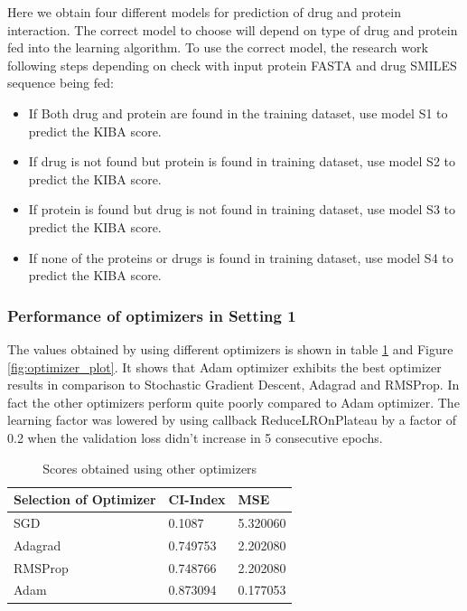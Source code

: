 Here we obtain four different models for prediction of drug and protein interaction. The correct model to choose will depend on type of drug and protein fed into the learning algorithm. To use the correct model, the research work following steps depending on check with input protein FASTA and drug SMILES sequence being fed:
\begin{itemize}
    \item If Both drug and protein are found in the training dataset, use model S1 to predict the KIBA score.
    \item If drug is not found but protein is found in training dataset, use model S2 to predict the KIBA score.
    \item If protein is found but drug is not found in training dataset, use model S3 to predict the KIBA score.
    \item If none of the proteins or drugs is found in training dataset, use model S4 to predict the KIBA score.
\end{itemize} 

\subsubsection{Performance of optimizers in Setting 1}

The values obtained by using different optimizers is shown in table \ref{table:optimizer} and Figure \ref{fig:optimizer_plot}. It shows that Adam optimizer exhibits the best optimizer results in comparison to Stochastic Gradient Descent, Adagrad and RMSProp. In fact the other optimizers perform quite poorly compared to Adam optimizer. The learning factor was lowered by using callback ReduceLROnPlateau by a factor of 0.2 when the validation loss didn't increase in 5 consecutive epochs.

\begin{table} [H]
    \centering
    \caption[Scores of different Optimizer] {Scores obtained using other optimizers}
    \label{table:optimizer}
    \begin{tabular}{|l|l|l|}
        \hline
        
        Selection of Optimizer & CI-Index & MSE \\ \toprule 
        
        \hline
        SGD & 0.1087 & 5.320060 \\ \hline
        Adagrad & 0.749753 & 2.202080 \\ \hline
        RMSProp & 0.748766 & 2.202080 \\ \hline
        Adam    & 0.873094 & 0.177053 \\ \hline
        
    \end{tabular}
    
\end{table}


